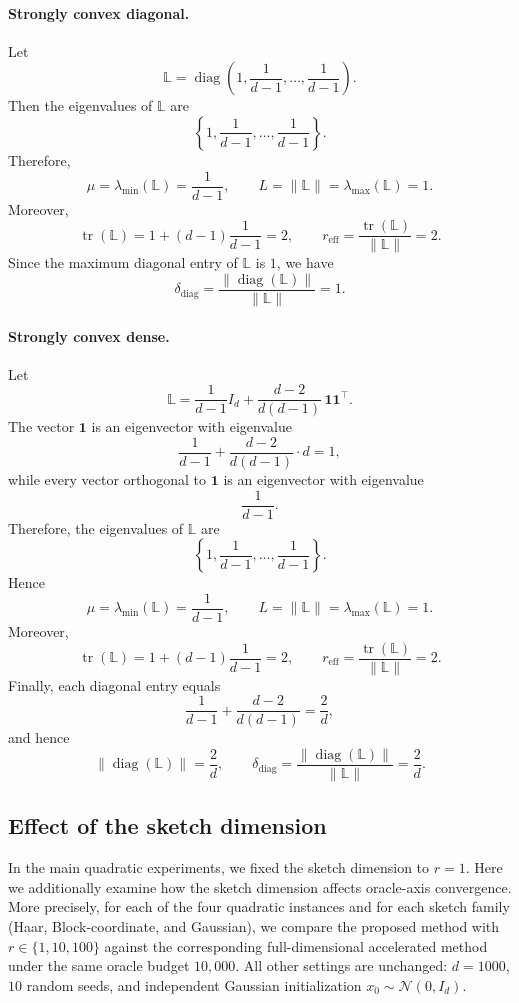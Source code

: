 \documentclass[10pt]{article}
\newcommand{\tr}{\operatorname{tr}}
\newcommand{\diag}{\operatorname{diag}}
\newcommand{\Lmat}{\mathbb{L}}
\begin{document}
\paragraph{Strongly convex diagonal.}
Let
\[
\Lmat
=
\diag\!\left(
1,
\frac{1}{d-1},
\dots,
\frac{1}{d-1}
\right).
\]
Then the eigenvalues of \(\Lmat\) are
\[
\left\{
1,
\frac{1}{d-1},
\ldots,
\frac{1}{d-1}
\right\}.
\]
Therefore,
\[
\mu=\lambda_{\min}(\Lmat)=\frac{1}{d-1},
\qquad
L=\|\Lmat\|=\lambda_{\max}(\Lmat)=1.
\]
Moreover,
\[
\tr(\Lmat)=1+(d-1)\frac{1}{d-1}=2,
\qquad
r_{\mathrm{eff}}=\frac{\tr(\Lmat)}{\|\Lmat\|}=2.
\]
Since the maximum diagonal entry of \(\Lmat\) is \(1\), we have
\[
\delta_{\mathrm{diag}}
=
\frac{\|\diag(\Lmat)\|}{\|\Lmat\|}
=
1.
\]

\paragraph{Strongly convex dense.}
Let
\[
\Lmat
=
\frac{1}{d-1}I_d
+
\frac{d-2}{d(d-1)}\,\mathbf{1}\mathbf{1}^\top.
\]
The vector \(\mathbf{1}\) is an eigenvector with eigenvalue
\[
\frac{1}{d-1}
+
\frac{d-2}{d(d-1)}\cdot d
=
1,
\]
while every vector orthogonal to \(\mathbf{1}\) is an eigenvector with eigenvalue
\[
\frac{1}{d-1}.
\]
Therefore, the eigenvalues of \(\Lmat\) are
\[
\left\{
1,
\frac{1}{d-1},
\ldots,
\frac{1}{d-1}
\right\}.
\]
Hence
\[
\mu=\lambda_{\min}(\Lmat)=\frac{1}{d-1},
\qquad
L=\|\Lmat\|=\lambda_{\max}(\Lmat)=1.
\]
Moreover,
\[
\tr(\Lmat)
=
1+(d-1)\frac{1}{d-1}
=
2,
\qquad
r_{\mathrm{eff}}
=
\frac{\tr(\Lmat)}{\|\Lmat\|}
=
2.
\]
Finally, each diagonal entry equals
\[
\frac{1}{d-1}
+
\frac{d-2}{d(d-1)}
=
\frac{2}{d},
\]
and hence
\[
\|\diag(\Lmat)\|=\frac{2}{d},
\qquad
\delta_{\mathrm{diag}}
=
\frac{\|\diag(\Lmat)\|}{\|\Lmat\|}
=
\frac{2}{d}.
\]

\subsection{Effect of the sketch dimension}
\label{app:exp-details-rscan}

In the main quadratic experiments, we fixed the sketch dimension to \(r=1\).
Here we additionally examine how the sketch dimension affects oracle-axis convergence.
More precisely, for each of the four quadratic instances and for each sketch family
(Haar, Block-coordinate, and Gaussian), we compare the proposed method with
\(r\in\{1,10,100\}\) against the corresponding full-dimensional accelerated method
under the same oracle budget \(10{,}000\).
All other settings are unchanged: \(d=1000\), \(10\) random seeds, and
independent Gaussian initialization \(x_0\sim\mathcal N(0,I_d)\).
\end{document}
